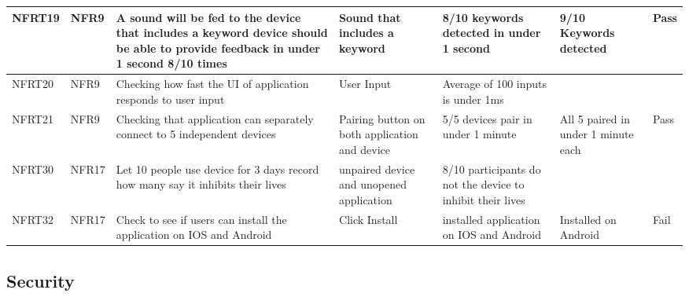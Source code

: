 \documentclass[12pt, titlepage]{article}
\begin{document}
\begin{longtable}{|p{1.4cm}|p{1cm}|p{3cm}|p{1.5cm}|p{2.5cm}|p{2cm}|p{1.2cm}|}
  NFRT19       & NFR9          & A sound will be fed to the device that includes a keyword device should be able to provide feedback in under 1 second 8/10 times& Sound that includes a keyword&8/10 keywords detected in under 1 second& 9/10 Keywords detected&{\color[HTML]{32CB00} Pass}         \\ \hline
  NFRT20       & NFR9          & Checking how fast the UI of application responds to user input   &User Input & Average of 100 inputs is under 1ms&                                                                                             & \cellcolor[HTML]{FFFFFF}{\color[HTML]{F8A102} TBD}  \\ \hline
  NFRT21       & NFR9          & Checking that application can separately connect to 5 independent devices&Pairing button on both application and device& 5/5 devices pair in under 1 minute & All 5 paired in under 1 minute each              &{\color[HTML]{32CB00} Pass}                          \\ \hline           
  NFRT30       & NFR17         & Let 10 people use device for 3 days record how many say it inhibits their lives &unpaired device and unopened application & 8/10 participants do not the device to inhibit their lives &                       &\cellcolor[HTML]{FFFFFF}{\color[HTML]{F8A102} TBD}    \\ \hline           
  NFRT32       & NFR17         & Check to see if users can install the application on IOS and Android& Click Install & installed application on IOS and Android&Installed on Android          &{\color[HTML]{FE0000} Fail}                                                       \\ \hline
\end{longtable}

\subsection{Security}
\end{document}
